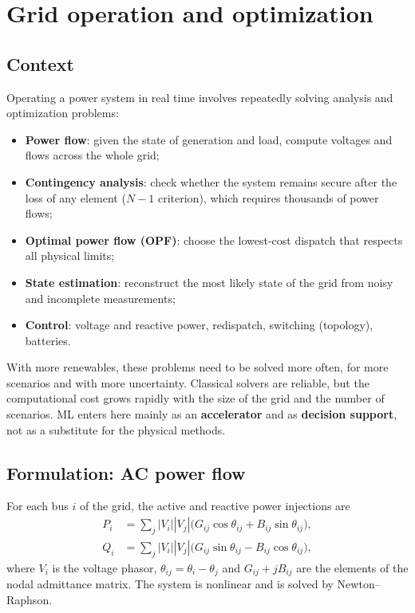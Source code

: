 \documentclass[10pt,a4paper,oneside]{article}
\begin{document}
\section{Grid operation and optimization}

\subsection{Context}

Operating a power system in real time involves repeatedly solving analysis
and optimization problems:
\begin{itemize}
  \item \textbf{Power flow}: given the state of generation and load, compute
    voltages and flows across the whole grid;
  \item \textbf{Contingency analysis}: check whether the system remains
    secure after the loss of any element ($N-1$ criterion), which requires
    thousands of power flows;
  \item \textbf{Optimal power flow (OPF)}: choose the lowest-cost dispatch
    that respects all physical limits;
  \item \textbf{State estimation}: reconstruct the most likely state of the
    grid from noisy and incomplete measurements;
  \item \textbf{Control}: voltage and reactive power, redispatch, switching
    (topology), batteries.
\end{itemize}

With more renewables, these problems need to be solved more often, for more
scenarios and with more uncertainty. Classical solvers are reliable, but the
computational cost grows rapidly with the size of the grid and the number of
scenarios. ML enters here mainly as an \textbf{accelerator} and as
\textbf{decision support}, not as a substitute for the physical methods.

\subsection{Formulation: AC power flow}

For each bus $i$ of the grid, the active and reactive power injections are
\begin{align}
  P_i &= \sum_{j} |V_i||V_j| \big(G_{ij}\cos\theta_{ij} + B_{ij}\sin\theta_{ij}\big), \\
  Q_i &= \sum_{j} |V_i||V_j| \big(G_{ij}\sin\theta_{ij} - B_{ij}\cos\theta_{ij}\big),
\end{align}
where $V_i$ is the voltage phasor, $\theta_{ij} = \theta_i - \theta_j$ and
$G_{ij} + jB_{ij}$ are the elements of the nodal admittance matrix. The
system is nonlinear and is solved by Newton--Raphson.
\end{document}
